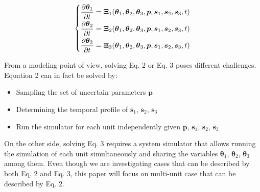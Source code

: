 \begin{equation}
  \begin{matrix}
     \begin{dcases*}
       \frac{\partial \boldsymbol{\theta}_1}{\partial t}  = \boldsymbol{\Xi}_1 (\boldsymbol{\theta}_1 , \boldsymbol{\theta}_2, \boldsymbol{\theta}_3 , \boldsymbol p, \boldsymbol{s}_1 ,
       \boldsymbol{s}_2 , \boldsymbol{s}_3, t)  \\
       \frac{\partial \boldsymbol{\theta}_2}{\partial t}  = \boldsymbol{\Xi}_2 (\boldsymbol{\theta}_1 , \boldsymbol{\theta}_2, \boldsymbol{\theta}_3 , \boldsymbol p, \boldsymbol{s}_1 ,
       \boldsymbol{s}_2 , \boldsymbol{s}_3, t)  \\
       \frac{\partial \boldsymbol{\theta}_3}{\partial t}  = \boldsymbol{\Xi}_3 (\boldsymbol{\theta}_1 , \boldsymbol{\theta}_2, \boldsymbol{\theta}_3 , \boldsymbol p, \boldsymbol{s}_1 ,
       \boldsymbol{s}_2 , \boldsymbol{s}_3, t)  \\
     \end{dcases*}
  \end{matrix}
  \label{eq:MU_tightCoupled}
\end{equation}

From a modeling point of view, solving Eq. 2 or Eq. 3 poses different challenges. Equation 2 can in fact be solved by:
\begin{itemize}
  \item Sampling the set of uncertain parameters $\boldsymbol p$
  \item Determining the temporal profile of $\boldsymbol{s}_1$, $\boldsymbol{s}_2$, $\boldsymbol{s}_3$
  \item Run the simulator for each unit independently given $\boldsymbol p$, $\boldsymbol{s}_1$, $\boldsymbol{s}_2$, $\boldsymbol{s}_3$
\end{itemize}
On the other side, solving Eq. 3 requires a system simulator that allows running the simulation of 
each unit simultaneously and sharing the variables $\boldsymbol{\theta}_1$, $\boldsymbol{\theta}_2$, $\boldsymbol{\theta}_3$ among them.
Even though we are investigating cases that can be described by both Eq. 2 and Eq. 3, this paper will 
focus on multi-unit case that can be described by Eq. 2. 



